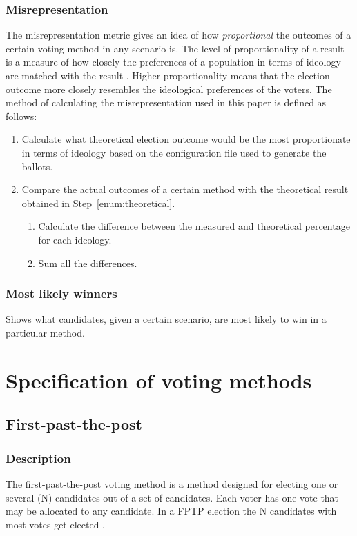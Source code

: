 \documentclass[12pt]{article}
\begin{document}
\subsubsection{Misrepresentation}
The misrepresentation metric gives an idea of how \textit{proportional} the outcomes of a certain voting method in any scenario is. The level of proportionality of a result is a measure of how closely the preferences of a population in terms of ideology are matched with the result \autocite{king200}. Higher proportionality means that the election outcome more closely resembles the ideological preferences of the voters. The method of calculating the misrepresentation used in this paper is defined as follows:
\begin{enumerate}
	\item Calculate what theoretical election outcome would be the most proportionate in terms of ideology based on the configuration file used to generate the ballots.\label{enum:theoretical}
	\item Compare the actual outcomes of a certain method with the theoretical result obtained in Step~\ref{enum:theoretical}.
	\begin{enumerate}
		\item Calculate the difference between the measured and theoretical percentage for each ideology.
		\item Sum all the differences.
	\end{enumerate}
\end{enumerate}
\subsubsection{Most likely winners}
Shows what candidates, given a certain scenario, are most likely to win in a particular method.
\pagebreak
\section{Specification of voting methods}
\subsection{First-past-the-post}
\subsubsection{Description}
The first-past-the-post voting method is a method designed for electing one or several (N) candidates out of a set of candidates. Each voter has one vote that may be allocated to any candidate. In a FPTP election the N candidates with most votes get elected \autocite{wilkinson2017}.
\end{document}
